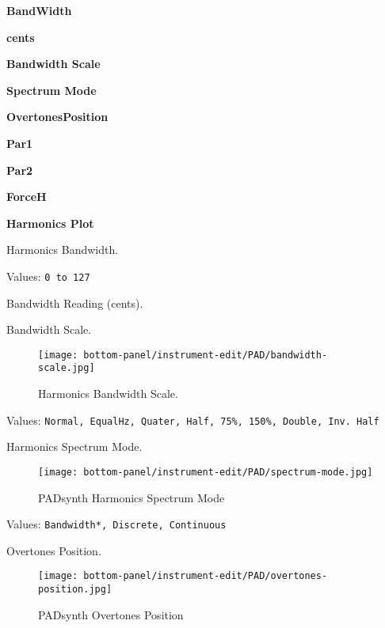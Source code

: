    \begin{enumber}
      \item \textbf{BandWidth}
      \item \textbf{cents}
      \item \textbf{Bandwidth Scale}
      \item \textbf{Spectrum Mode}
      \item \textbf{OvertonesPosition}
      \item \textbf{Par1}
      \item \textbf{Par2}
      \item \textbf{ForceH}
      \item \textbf{Harmonics Plot}
   \end{enumber}

   \setcounter{ItemCounter}{0}      %

   Harmonics Bandwidth.

   Values: \texttt{0 to 127}

   Bandwidth Reading (cents).

   Bandwidth Scale.

\begin{figure}[H]
   \centering 
   \texttt{[image: bottom-panel/instrument-edit/PAD/bandwidth-scale.jpg]}
   \caption{Harmonics Bandwidth Scale.}
   \label{fig:padsynth_harmonics_bandwidth_scale}
\end{figure}

   Values: \texttt{Normal, EqualHz, Quater, Half, 75\%, 150\%, Double, Inv.  Half}

   Harmonics Spectrum Mode.

\begin{figure}[H]
   \centering 
   \texttt{[image: bottom-panel/instrument-edit/PAD/spectrum-mode.jpg]}
   \caption{PADsynth Harmonics Spectrum Mode}
   \label{fig:padsynth_harmonics_spectrum mode}
\end{figure}

   Values: \texttt{Bandwidth*, Discrete, Continuous}

   Overtones Position.

\begin{figure}[H]
   \centering 
   \texttt{[image: bottom-panel/instrument-edit/PAD/overtones-position.jpg]}
   \caption{PADsynth Overtones Position}
   \label{fig:padsynth_overtones_position}
\end{figure}

